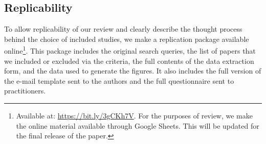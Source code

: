 \subsection{Replicability}
\label{subsec:replicability}

To allow replicability of our review and clearly describe the thought process behind the choice of included studies, we make a replication package available online\footnote{Available at: \url{https://bit.ly/3gCKh7V}.
For the purposes of review, we make the online material available through Google Sheets. This will be updated for the final release of the paper.}.
This package includes the original search queries, the list of papers that we included or excluded via the criteria, the full contents of the data extraction form, and the data used to generate the figures.
It also includes the full version of the e-mail template sent to the authors and the full questionnaire sent to practitioners.